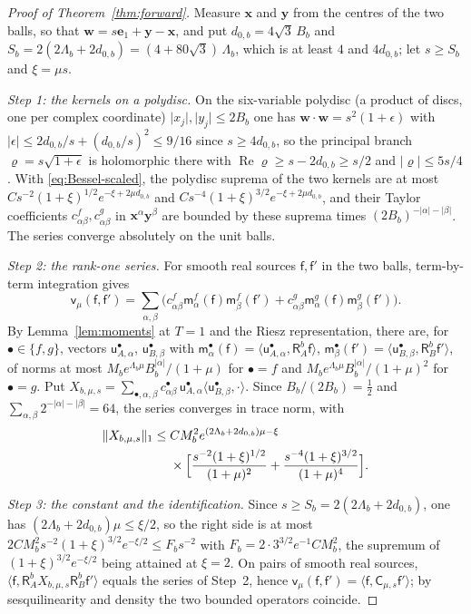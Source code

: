 \documentclass[aps,prl,reprint,longbibliography,raggedbottom]{revtex4-2}
\newcommand{\norm}[1]{\lVert #1\rVert}
\newcommand{\abs}[1]{\lvert #1\rvert}
\newcommand{\ip}[2]{\langle #1,#2\rangle}
\DeclareMathOperator{\Rea}{Re}
\newcommand{\Res}{\mathsf R}
\newcommand{\cov}{\mathsf v}
\newcommand{\sx}{\mathsf f}
\newcommand{\sy}{\mathsf f'}
\newcommand{\bx}{\mathbf x}
\newcommand{\by}{\mathbf y}
\newcommand{\eone}{\mathbf e_1}
\begin{document}
\begin{proof}[Proof of Theorem~\ref{thm:forward}]
Measure $\bx$ and $\by$ from the centres of the two balls, so that
$\mathbf w=s\eone+\by-\bx$, and put $d_{0,b}=4\sqrt3\,B_b$ and
$S_b=2(2\Lambda_b+2d_{0,b})=(4+80\sqrt3)\,\Lambda_b$, which is at
least $4$ and $4d_{0,b}$; let $s\ge S_b$ and $\xi=\mu s$.

\emph{Step 1: the kernels on a polydisc.} On the six-variable polydisc
(a product of discs, one per complex coordinate)
$\abs{x_j},\abs{y_j}\le2B_b$ one has
$\mathbf w\cdot\mathbf w=s^2(1+\epsilon)$ with
$\abs\epsilon\le2d_{0,b}/s+(d_{0,b}/s)^2\le9/16$ since
$s\ge4d_{0,b}$, so the principal branch
$\varrho=s\sqrt{1+\epsilon}$ is holomorphic there with
$\Rea\varrho\ge s-2d_{0,b}\ge s/2$ and $\abs\varrho\le5s/4$. With
\eqref{eq:Bessel-scaled}, the polydisc suprema of the two kernels are
at most $Cs^{-2}(1+\xi)^{1/2}e^{-\xi+2\mu d_{0,b}}$ and
$Cs^{-4}({1+\xi})^{3/2}e^{-\xi+2\mu d_{0,b}}$, and their Taylor coefficients
$c^f_{\alpha\beta},c^g_{\alpha\beta}$ in $\bx^\alpha\by^\beta$ are
bounded by these suprema times $(2B_b)^{-\abs\alpha-\abs\beta}$.
The series converge absolutely on the unit balls.

\emph{Step 2: the rank-one series.} For smooth real sources $\sx,\sy$
in the two balls, term-by-term integration gives
\[
\cov_\mu(\sx,\sy)=\sum_{\alpha,\beta}\bigl(c^f_{\alpha\beta}\mathsf m^f_\alpha(\sx)\mathsf m^f_\beta(\sy)
+c^g_{\alpha\beta}\mathsf m^g_\alpha(\sx)\mathsf m^g_\beta(\sy)\bigr).
\]
By Lemma~\ref{lem:moments} at $T=1$ and the Riesz representation,
there are, for $\bullet\in\{f,g\}$, vectors
$\mathsf u^\bullet_{A,\alpha}$, $\mathsf u^\bullet_{B,\beta}$ with
$\mathsf m^\bullet_\alpha(\sx)=\ip{\mathsf u^\bullet_{A,\alpha}}{\Res_A^b\sx}$,
$\mathsf m^\bullet_\beta(\sy)=\ip{\mathsf u^\bullet_{B,\beta}}{\Res_B^b\sy}$,
of norms at most $M_be^{\Lambda_b\mu}B_b^{\abs\alpha}/({1+\mu})$ for
$\bullet=f$ and $M_be^{\Lambda_b\mu}B_b^{\abs\alpha}/(1+\mu)^2$ for
$\bullet=g$. Put
$X_{b,\mu,s}=\sum_{\bullet,\alpha,\beta}c^\bullet_{\alpha\beta}\,
\mathsf u^\bullet_{A,\alpha}\ip{\mathsf u^\bullet_{B,\beta}}{\cdot}$.
Since $B_b/(2B_b)=\tfrac12$ and
$\sum_{\alpha,\beta}2^{-\abs\alpha-\abs\beta}=64$, the series converges
in trace norm, with
\[
\begin{split}
\norm{X_{b,\mu,s}}_1
\le{}& CM_b^2e^{(2\Lambda_b+2d_{0,b})\mu-\xi}\\
&\times\Bigl[\frac{s^{-2}(1+\xi)^{1/2}}{(1+\mu)^2}
+\frac{s^{-4}(1+\xi)^{3/2}}{(1+\mu)^4}\Bigr].
\end{split}
\]

\emph{Step 3: the constant and the identification.} Since
$s\ge S_b=2(2\Lambda_b+2d_{0,b})$, one has
$(2\Lambda_b+2d_{0,b})\mu\le\xi/2$, so the right side is at most
$2CM_b^2s^{-2}(1+\xi)^{3/2}e^{-\xi/2}\le F_bs^{-2}$ with
$F_b=2\cdot3^{3/2}e^{-1}CM_b^2$, the supremum of $(1+\xi)^{3/2}e^{-\xi/2}$
being attained at $\xi=2$. On pairs of smooth real sources,
$\ip\sx{\Res_A^bX_{b,\mu,s}\Res_B^b\sy}$ equals the series of Step~2,
hence $\cov_\mu(\sx,\sy)=\ip\sx{\mathsf C_{\mu,s}\sy}$; by sesquilinearity and
density the two bounded operators coincide.
\end{proof}
\end{document}
